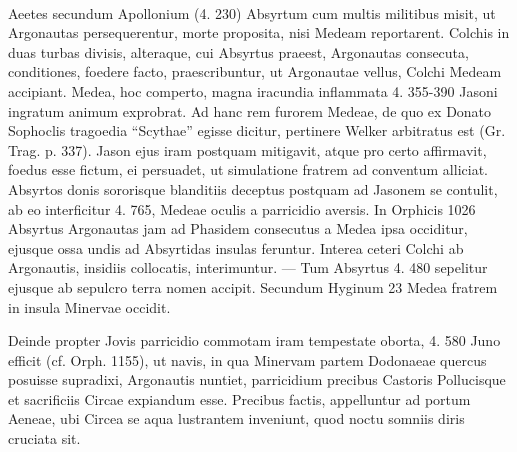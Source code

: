 \documentclass[a4paper, 11pt, oneside, polutonikogreek, german]{article}
\begin{document}
\paragraph{}
Aeetes secundum Apollonium (4. 230) Absyrtum cum multis militibus misit, ut Argonautas persequerentur, morte proposita, nisi Medeam reportarent. Colchis in duas turbas divisis, alteraque, cui Absyrtus praeest, Argonautas consecuta, conditiones, foedere facto, praescribuntur, ut Argonautae vellus, Colchi Medeam accipiant. Medea, hoc comperto, magna iracundia inflammata 4. 355-390 Jasoni ingratum animum exprobrat. Ad hanc rem furorem Medeae, de quo ex Donato Sophoclis tragoedia "`Scythae"' egisse dicitur, pertinere Welker arbitratus est (Gr. Trag. p. 337). Jason ejus iram postquam mitigavit, atque pro certo affirmavit, foedus esse fictum, ei persuadet, ut simulatione fratrem ad conventum alliciat. Absyrtos donis sororisque blanditiis deceptus postquam ad Jasonem se contulit, ab eo interficitur 4. 765, Medeae oculis a parricidio aversis. In Orphicis 1026 Absyrtus Argonautas jam ad Phasidem consecutus a Medea ipsa occiditur, ejusque ossa undis ad Absyrtidas insulas feruntur. Interea ceteri Colchi ab Argonautis, insidiis collocatis, interimuntur. --- Tum Absyrtus 4. 480 sepelitur ejusque ab sepulcro terra nomen accipit. Secundum Hyginum 23 Medea fratrem in insula Minervae occidit.

Deinde propter Jovis parricidio commotam iram tempestate oborta, 4. 580 Juno efficit (cf. Orph. 1155), ut navis, in qua Minervam partem Dodonaeae quercus posuisse supradixi, Argonautis nuntiet, parricidium precibus Castoris Pollucisque et sacrificiis Circae expiandum esse. Precibus factis, appelluntur ad portum Aeneae, ubi Circea se aqua lustrantem inveniunt, quod noctu somniis diris cruciata sit.
\end{document}
